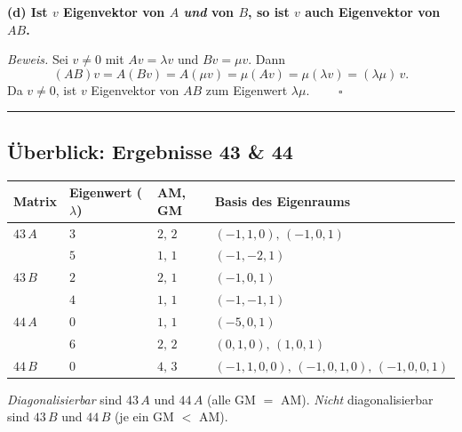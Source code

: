 \documentclass[a4paper,12pt]{article}
\newcommand{\EW}{Eigenwert}
\newcommand{\EV}{Eigenvektor}
\begin{document}
\textbf{(d) Ist $v$ \EV{} von $A$ \emph{und} von $B$, so ist $v$ auch \EV{} von $AB$.}

\textit{Beweis.} Sei $v \neq 0$ mit $Av = \lambda v$ und $Bv = \mu v$. Dann
\[
(AB)v = A(Bv) = A(\mu v) = \mu (Av) = \mu (\lambda v) = (\lambda\mu)\,v.
\]
Da $v \neq 0$, ist $v$ \EV{} von $AB$ zum \EW{} $\lambda\mu$. $\qquad\square$

\bigskip
\hrule
\bigskip

\subsection*{\"Uberblick: Ergebnisse 43 \& 44}

\begin{center}
\begin{tabular}{@{}llll@{}}
\toprule
Matrix & \EW{} ($\lambda$) & AM, GM & Basis des Eigenraums \\
\midrule
$43\,A$ & $3$ & $2,\,2$ & $(-1,1,0),\,(-1,0,1)$ \\
        & $5$ & $1,\,1$ & $(-1,-2,1)$ \\[2pt]
$43\,B$ & $2$ & $2,\,1$ & $(-1,0,1)$ \\
        & $4$ & $1,\,1$ & $(-1,-1,1)$ \\[2pt]
$44\,A$ & $0$ & $1,\,1$ & $(-5,0,1)$ \\
        & $6$ & $2,\,2$ & $(0,1,0),\,(1,0,1)$ \\[2pt]
$44\,B$ & $0$ & $4,\,3$ & $(-1,1,0,0),\,(-1,0,1,0),\,(-1,0,0,1)$ \\
\bottomrule
\end{tabular}
\end{center}

\textit{Diagonalisierbar} sind $43\,A$ und $44\,A$ (alle GM $=$ AM). \emph{Nicht} diagonalisierbar sind $43\,B$ und $44\,B$ (je ein GM $<$ AM).
\end{document}
